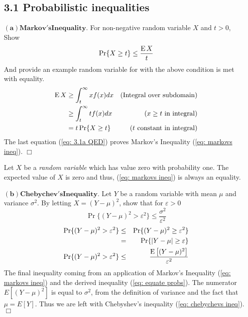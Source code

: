 \documentclass[10pt]{article}
\DeclareMathOperator*{\E}{\mbox{\text{E}}}
\newcommand{\pref}[1]{{(\ref{#1})}}
\begin{document}
\begin{tiny}
\begin{multicols}{3}
\section*{3.1 Probabilistic inequalities} %
$\mathbf{(a) Markov's Inequality.}$
For non-negative random variable $X$ and  $t>0$,
Show
\begin{equation}
    \Pr\{X \geq t\} \leq \frac{\E X}{t} \label{eq: markovs ineq}
\end{equation}
And provide an example random variable for with the above condition is met
with equality.
\proof
\begin{eqnarray}
    \E X %
    &\geq \int_t^\infty x f(x)dx &\text{(Integral over subdomain)} 
    \nonumber \\
    &\geq \int_t^\infty t f(x)dx &\text{($x \geq t$ in integral)} 
        \nonumber \\
    &= t \Pr\{X \geq t\}  &\text{($t$ constant in integral)}
        \label{eq: 3.1a QED}
\end{eqnarray}
The last equation \pref{eq: 3.1a QED} proves Markov's Inequality
\pref{eq: markovs ineq}. $\Box$

Let $X$ be a \emph{random variable} which has value zero with probability
one.
The expected value of $X$ is zero and thus, 
\pref{eq: markovs ineq} is always an equality.

$\mathbf{(b) Chebychev's Inequality.}$
Let $Y$ be a random variable with mean $\mu$ and
variance $\sigma^2$. By letting $X = (Y-\mu)^2$, show that for
$\varepsilon > 0$
\begin{equation}
    \Pr \{(Y-\mu)^2 > \varepsilon^2\} \leq \frac{\sigma^2}{\varepsilon^2}
    \label{eq: chebychevs ineq}
\end{equation}
\proof
\begin{eqnarray}
    \Pr\{(Y-\mu)^2 > \varepsilon^2\} &\leq& \Pr\{(Y-\mu)^2 \geq \varepsilon^2\}
        \nonumber \\
        &=& \Pr\{|Y-\mu| \geq \varepsilon\}
        \label{eq: equate probs} \\
    \Pr \{(Y-\mu)^2 > \varepsilon^2\} &\leq& \frac{\E \big[(Y-\mu)^2\big]}{\varepsilon^2}
        \label{eq:instatiate 3.1a}
\end{eqnarray}
The final inequality coming from an application of Markov's Inequality
\pref{eq: markovs ineq} and the derived inequality \pref{eq: equate probs}.
The numerator $E[(Y-\mu)^2]$ is equal to $\sigma^2$, from the definition
of variance and the fact that $\mu = E[Y]$. Thus we are left with
Chebyshev's inequality \pref{eq: chebychevs ineq}. $\Box$


\end{multicols}
\end{tiny}
\end{document}
